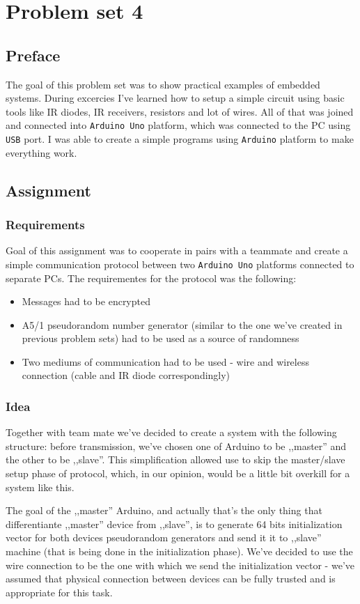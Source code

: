 \section{Problem set 4}
\subsection{Preface}

The goal of this problem set was to show practical examples of embedded systems.
During excercies I've learned how to setup a simple circuit using basic tools
like IR diodes, IR receivers, resistors and lot of wires. All of that was joined
and connected into \texttt{Arduino Uno} platform, which was connected to the PC
using \texttt{USB} port. I was able to create a simple programs using
\texttt{Arduino} platform to make everything work.

\subsection{Assignment}
\subsubsection{Requirements}
Goal of this assignment was to cooperate in pairs with a teammate and create a simple communication protocol between two \texttt{Arduino Uno} platforms connected to separate PCs. The requirementes for the protocol was the following:
\begin{itemize}
  \item Messages had to be encrypted
  \item A5/1 pseudorandom number generator (similar to the one we've created in previous problem sets) had to be used as a source of randomness
  \item Two mediums of communication had to be used - wire and wireless connection (cable and IR diode correspondingly)
\end{itemize}
\subsubsection{Idea}
Together with team mate we've decided to create a system with the following structure: before transmission, we've chosen one of Arduino to be ,,master'' and the other to be ,,slave''. This simplification allowed use to skip the master/slave setup phase of protocol, which, in our opinion, would be a little bit overkill for a system like this.

The goal of the ,,master'' Arduino, and actually that's the only thing that differentiante ,,master'' device from ,,slave'', is to generate 64 bits initialization vector for both devices pseudorandom generators and send it it to ,,slave'' machine (that is being done in the initialization phase).  We've decided to use the wire connection to be the one with which we send the initialization vector - we've assumed that physical connection between devices can be fully trusted and is appropriate for this task.

